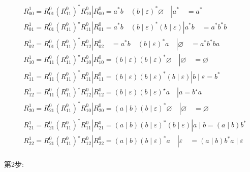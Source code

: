 \documentclass{ctexart}
\begin{document}
\begin{example}
$$
\begin{aligned}
& R_{00}^1=R_{01}^0\left(R_{11}^0\right)^* R_{10}^0\left|R_{00}^0=a^* b \quad(b \mid \varepsilon)^* \varnothing \quad\right| a^* \quad=a^* \\
& R_{01}^1=R_{01}^0\left(R_{11}^0\right)^{\star} R_{11}^0\left|R_{01}^0=a^* b \quad(b \mid \varepsilon)^*(b \mid \varepsilon)\right| a^* b \quad=a^* b^* b \\
& R_{02}^1=R_{01}^0\left(R_{11}^0\right)^* R_{12}^0\left|R_{02}^0 \quad=a^* b \quad(b \mid \varepsilon)^* a \quad\right| \varnothing \quad=a^* b^* b a \\
& R_{10}^1=R_{11}^0\left(R_{11}^0\right)^{\star} R_{10}^0\left|R_{10}^0=(b \mid \varepsilon)(b \mid \varepsilon)^* \varnothing \quad\right| \varnothing \quad=\varnothing \\
& R_{11}^1=R_{11}^0\left(R_{11}^0\right)^* R_{11}^0\left|R_{11}^0=(b \mid \varepsilon)(b \mid \varepsilon)^*(b \mid \varepsilon)\right| b \mid \varepsilon=b^* \\
& R_{12}^1=R_{11}^0\left(R_{11}^0\right)^{\star} R_{12}^0\left|R_{12}^0=(b \mid \varepsilon)(b \mid \varepsilon)^{\star} a \quad\right| a=b^{\star} a \\
& R_{20}^1=R_{21}^0\left(R_{11}^0\right)^* R_{10}^0\left|R_{20}^0=(a \mid b)(b \mid \varepsilon)^* \varnothing \quad\right| \varnothing \quad=\varnothing \\
& R_{21}^1=R_{21}^0\left(R_{11}^0\right)^* R_{11}^0\left|R_{21}^0=(a \mid b)(b \mid \varepsilon)^*(b \mid \varepsilon)\right| a \mid b=(a \mid b) b^* \\
& R_{22}^1=R_{21}^0\left(R_{11}^0\right)^{\star} R_{12}^0\left|R_{22}^0=(a \mid b)(b \mid \varepsilon)^* a \quad\right| \varepsilon \quad=(a \mid b) b^* a \mid \varepsilon \\
&
\end{aligned}
$$

第2步:


\end{example}
\end{document}

